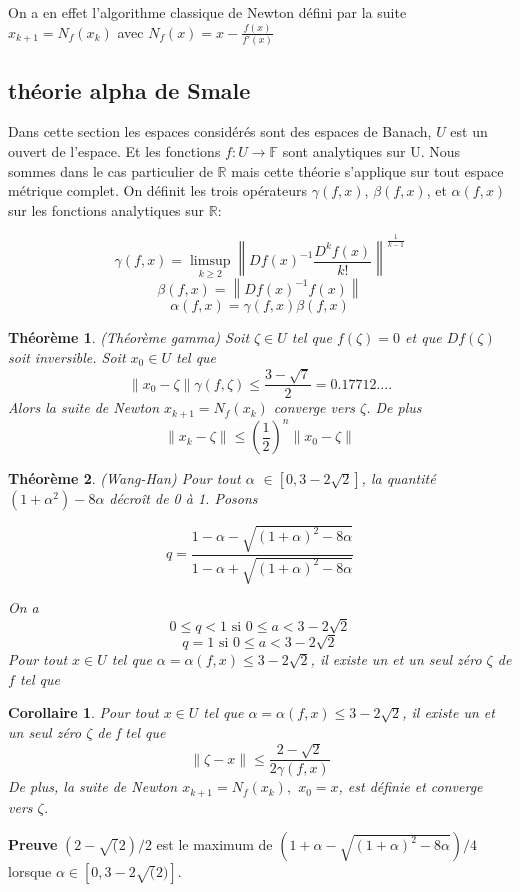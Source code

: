 \documentclass[a4paper,11pt]{article}
\begin{document}
On a en effet l'algorithme classique de Newton défini par la suite $x_{k+1}=N_{f}(x_{k})$ avec $N_{f}(x)=x-\frac{f(x)}{f'(x)}$ 


\subsection{théorie alpha de Smale}

Dans cette section les espaces considérés sont des espaces de Banach, $U$ est un ouvert de l'espace. Et les fonctions $f:U\rightarrow \mathbb{F}$ sont analytiques sur U. Nous sommes dans le cas particulier de $\mathbb{R}$ mais cette théorie s'applique sur tout espace métrique complet. 
On définit les trois opérateurs $\gamma(f,x)$, $\beta(f,x)$, et $\alpha(f,x)$ sur les fonctions analytiques sur $\mathbb{R}$:

\[\gamma(f,x)=\limsup_{k \geq 2}\left\|Df(x)^{-1}\frac{D^{k}f(x)}{k!}\right\|^{\frac{1}{k-1}}\]
\[\beta(f,x)=\left\|Df(x)^{-1}f(x)\right\|\]
\[\alpha(f,x)=\gamma(f,x)\beta(f,x)\]

\newtheorem{theorem}{Théorème}
\begin{theorem}(Théorème gamma) Soit $\zeta \in U$ tel que $f(\zeta)=0$ et que $Df(\zeta)$ soit inversible. Soit $x_{0} \in U$ tel que \\
	\[\left\|x_{0}-\zeta\right\|\gamma(f,\zeta) \leq \frac{3-\sqrt{7}}{2}=0.17712.... \]
	Alors la suite de Newton $x_{k+1}=N_{f}(x_{k})$ converge vers $\zeta$. De plus\\
	\[\left\|x_{k}-\zeta\right\| \leq \left(\frac{1}{2}\right)^{n}\left\|x_{0}-\zeta\right\|\]
\end{theorem}


\begin{theorem} (Wang-Han)
 Pour tout $\alpha$ $\in [0,3-2\sqrt{2}]$, la quantité $(1+\alpha^{2})-8\alpha$ décroît de 0 à 1. Posons

\[q=\frac{1-\alpha-\sqrt{(1+\alpha)^{2}-8\alpha}}{1-\alpha+\sqrt{(1+\alpha)^{2}-8\alpha}}\]

On a
\[0 \leq q<1 \text{ si } 0 \leq a < 3-2\sqrt{2}\]
\[q=1        \text{ si } 0 \leq a < 3-2\sqrt{2}\]
Pour tout $x\in U$ tel que $\alpha=\alpha(f,x) \leq 3-2\sqrt{2}$, il existe un et un seul zéro $\zeta$ de $f$ tel que\\
\end{theorem}

\newtheorem{corollaire}{Corollaire}
\begin{corollaire}
Pour tout $x\in U$ tel que $\alpha=\alpha(f,x) \leq 3-2\sqrt{2}$, il existe un et un seul zéro $\zeta$ de f tel que
\[\left\|\zeta-x\right\|\leq\frac{2-\sqrt{2}}{2\gamma(f,x)}\]
	De plus, la suite de Newton $x_{k+1}=N_{f}(x_{k}),$ $x_{0}=x$, est définie et converge vers $\zeta$.
\end{corollaire}
\noindent \textbf{Preuve} $(2-\sqrt(2)/2$ est le maximum de $(1+\alpha-\sqrt{(1+\alpha)^{2}-8\alpha})/4$ lorsque $\alpha \in [0,3-2\sqrt(2)]$.
\end{document}
